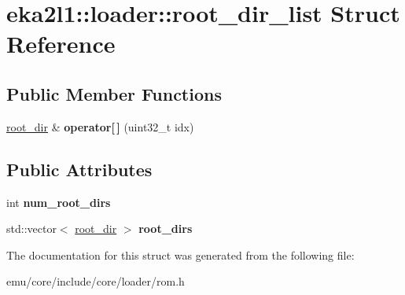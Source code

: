 \hypertarget{structeka2l1_1_1loader_1_1root__dir__list}{}\section{eka2l1\+:\+:loader\+:\+:root\+\_\+dir\+\_\+list Struct Reference}
\label{structeka2l1_1_1loader_1_1root__dir__list}
\subsection*{Public Member Functions}
\begin{DoxyCompactItemize}
\item 
\mbox{\label{structeka2l1_1_1loader_1_1root__dir__list_a2043ff4f103f3c75fb15c766b35e4d16}} 
\mbox{\hyperlink{structeka2l1_1_1loader_1_1root__dir}{root\+\_\+dir}} \& {\bfseries operator\mbox{[}$\,$\mbox{]}} (uint32\+\_\+t idx)
\end{DoxyCompactItemize}
\subsection*{Public Attributes}
\begin{DoxyCompactItemize}
\item 
\mbox{\label{structeka2l1_1_1loader_1_1root__dir__list_ad325f47f02ef245659198ae18c14de0c}} 
int {\bfseries num\+\_\+root\+\_\+dirs}
\item 
\mbox{\label{structeka2l1_1_1loader_1_1root__dir__list_a7450f820ca17b95206fa7f7bfcdf7355}} 
std\+::vector$<$ \mbox{\hyperlink{structeka2l1_1_1loader_1_1root__dir}{root\+\_\+dir}} $>$ {\bfseries root\+\_\+dirs}
\end{DoxyCompactItemize}


The documentation for this struct was generated from the following file\+:\begin{DoxyCompactItemize}
\item 
emu/core/include/core/loader/rom.\+h\end{DoxyCompactItemize}

